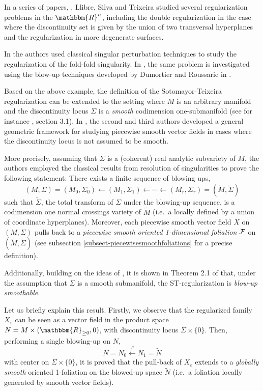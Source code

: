 \documentclass[11pt,psamsfonts]{article}
\theoremstyle{definition}
\theoremstyle{remark}
\newcommand{\cR}{\ensuremath{\mathbbm{R}}}
\newcommand{\eps}{\varepsilon }
\newcommand{\R}{\ensuremath{\cR}}
\begin{document}
In a series of papers, \cite{LST, LST3, LST4, LST5}, Llibre, Silva and Teixeira studied several regularization problems in the $\R^n$, including the double 
regularization in the case where the discontinuity set is given by the union of two transversal hyperplanes and 
the regularization in more degenerate surfaces.  

In \cite {BRT, BLT}  the authors used classical singular perturbation techniques to study the regularization of the fold-fold singularity.  In \cite{Kr2}, the same problem is investigated using the blow-up techniques developed by Dumortier and Roussarie in \cite {DR}.

Based on the above example, the definition of the Sotomayor-Teixeira regularization can be extended to the setting where $M$ is an arbitrary manifold and the discontinuity locus $\Sigma$ is a {\em smooth} codimension one-submanifold (see for instance \cite{PS}, section 3.1). In \cite{PS}, the second and third authors developed a general geometric framework for studying piecewise smooth vector fields in cases where the discontinuity locus is not assumed to be smooth. 


More precisely, assuming that $\Sigma$ is a (coherent) real analytic subvariety of $M$, the authors employed the classical results from resolution of singularities to prove the following statement: There exists a finite sequence of blowing ups,
$$
(M,\Sigma) = (M_0,\Sigma_0) \leftarrow (M_1,\Sigma_1) \leftarrow \cdots \leftarrow (M_r,\Sigma_r) = (\widetilde{M},\widetilde{\Sigma})
$$
such that $\widetilde{\Sigma}$, the total transform of $\Sigma$ under the blowing-up sequence, is a codimension one normal crossings variety of $\widetilde{M}$ (i.e.~a locally defined by a union of coordinate hyperplanes). Moreover, each piecewise smooth vector field $X$ on $(M,\Sigma)$ pulls back to a {\em piecewise smooth oriented 1-dimensional foliation} $\cal F$ on $(\widetilde{M},\widetilde{\Sigma})$ (see subsection \ref{subsect-piecewisesmoothfoliations} for a precise definition). 

Additionally, building on the ideas of \cite{BPT},  it is shown in Theorem 2.1 of \cite{PS} that, under the assumption that $\Sigma$ is a smooth submanifold, the ST-regularization is {\em blow-up smoothable}. 

Let us briefly explain this result. Firstly, we observe that the regularized family $X_\eps$ can be seen as a vector field in the product space $N = M \times (\cR_{\ge 0},0)$, with discontinuity locus $\Sigma \times \{ 0\}$. Then, performing a single blowing-up on $N$,
$$
N = N_0
\xleftarrow{\;\varphi\;}
N_1 = \widetilde{N}
$$
with center on $\Sigma \times \{ 0\}$, it is proved that the pull-back of  $X_\eps$ extends to a {\em globally smooth} oriented 1-foliation on the blowed-up space $\widetilde{N}$  (i.e.~a foliation locally generated by smooth vector fields).
\end{document}
